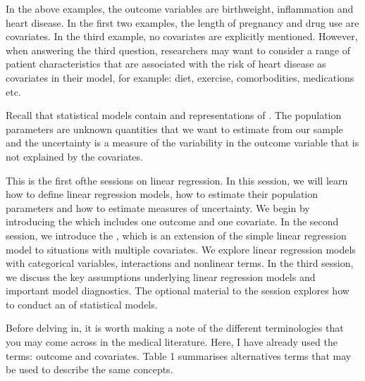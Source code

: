 \documentclass[letterpaper,10pt,english]{jupyterBook}
\begin{document}
\sphinxAtStartPar
In the above examples, the outcome variables are birthweight, inflammation and heart disease. In the first two examples, the length of pregnancy and drug use are covariates. In the third example, no covariates are explicitly mentioned. However, when answering the third question, researchers may want to consider a range of patient characteristics that are associated with the risk of heart disease as covariates in their model, for example: diet, exercise, comorbodities, medications etc.

\sphinxAtStartPar
Recall that statistical models contain  and representations of . The population parameters are unknown quantities that we want to estimate from our sample and the uncertainty is a measure of the variability in the outcome variable that is not explained by the covariates.

\sphinxAtStartPar
This is the first ofthe sessions on linear regression. In this session, we will learn how to define linear regression models, how to estimate their population parameters and how to estimate measures of uncertainty. We begin by introducing the  which includes one outcome and one covariate. In the second session, we introduce the , which is an extension of the simple linear regression model to situations with multiple covariates. We explore linear regression models with categorical variables, interactions and non\sphinxhyphen{}linear terms. In the third session, we discuss the key assumptions underlying linear regression models and important model diagnostics. The optional material to the session explores how to conduct an  of statistical models.

\sphinxAtStartPar
Before delving in, it is worth making a note of the different terminologies that you may come across in the medical literature. Here, I have already used the terms: outcome and covariates. Table 1 summarises alternatives terms that may be used to describe the same concepts.
\end{document}
